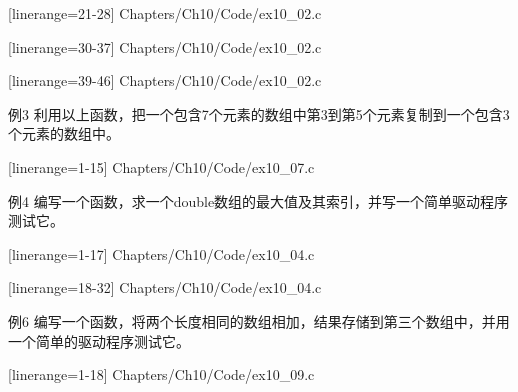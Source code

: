 \begin{frame}[fragile]\ft{\subsecname}

[linerange={21-28}]
{Chapters/Ch10/Code/ex10_02.c}
\end{frame}

\begin{frame}[fragile]\ft{\subsecname}

[linerange={30-37}]
{Chapters/Ch10/Code/ex10_02.c}
\end{frame}

\begin{frame}[fragile]\ft{\subsecname}

[linerange={39-46}]
{Chapters/Ch10/Code/ex10_02.c}
\end{frame}

\begin{frame}[fragile]\ft{\subsecname}
\begin{block}{例3}
利用以上函数，把一个包含7个元素的数组中第3到第5个元素复制到一个包含3个元素的数组中。
\end{block}
\end{frame}

\begin{frame}[fragile]\ft{\subsecname}

[linerange={1-15}]
{Chapters/Ch10/Code/ex10_07.c}
\end{frame}


\begin{frame}[fragile]\ft{\subsecname}
\begin{block}{例4}
编写一个函数，求一个double数组的最大值及其索引，并写一个简单驱动程序测试它。
\end{block}
\end{frame}

\begin{frame}[fragile]\ft{\subsecname}

[linerange={1-17}]
{Chapters/Ch10/Code/ex10_04.c}
\end{frame}

\begin{frame}[fragile]\ft{\subsecname}

[linerange={18-32}]
{Chapters/Ch10/Code/ex10_04.c}
\end{frame}

\begin{frame}[fragile]\ft{\subsecname}
\begin{block}{例6}
编写一个函数，将两个长度相同的数组相加，结果存储到第三个数组中，并用一个简单的驱动程序测试它。
\end{block}
\end{frame}

\begin{frame}[fragile]\ft{\subsecname}

[linerange={1-18}]
{Chapters/Ch10/Code/ex10_09.c}
\end{frame}



